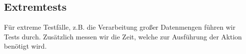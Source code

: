 %



\newpage



\subsection*{Extremtests}
\label{Abschnitt:Tests:Protokoll:Extrem}

Für extreme Testfälle, z.B. die Verarbeitung großer Datenmengen führen wir Tests durch. Zusätzlich messen wir die Zeit, welche zur Ausführung der Aktion benötigt wird.





